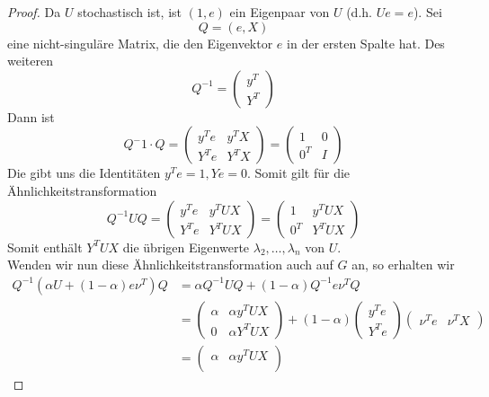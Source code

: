 \documentclass[]{article}
\begin{document}
\begin{proof}
	Da $U$ stochastisch ist, ist $(1, e)$ ein Eigenpaar von $U$ (d.h. $Ue = e$).
	Sei 
	\[ Q = (e, X) \]
	eine nicht-singuläre Matrix, die den Eigenvektor $e$ in der ersten Spalte hat. Des weiteren
	\[ Q^{-1} = \begin{pmatrix} y^T \\ Y^T \end{pmatrix} \]
	Dann ist
	\begin{equation*}
	Q^-1 \cdot Q =
	\begin{pmatrix}
	y^T e & y^T X \\
	Y^T e & Y^T X
	\end{pmatrix} =
	\begin{pmatrix}
	1 & 0 \\
	0^T & I 
	\end{pmatrix}
	\end{equation*}
	Die gibt uns die Identitäten $y^T e = 1, Ye = 0$. Somit gilt für die Ähnlichkeitstransformation 
	\begin{equation*}
	Q^{-1} U Q =
	\begin{pmatrix}
	y^T e & y^T U X \\
	Y^T e & Y^T U X
	\end{pmatrix} =
	\begin{pmatrix}
	1 & y^T U X \\
	0^T & Y^T U X 
	\end{pmatrix}
	\end{equation*}
	Somit enthält $Y^T U X$ die übrigen Eigenwerte $\lambda_2, \dotsc, \lambda_n$ von $U$. \\
	Wenden wir nun diese Ähnlichkeitstransformation auch auf $G$ an, so erhalten wir
	\begin{align*}
	Q^{-1} \left( \alpha U + (1- \alpha) e \nu^T \right) Q  
	&= \alpha Q^{-1} U Q + (1- \alpha) Q^{-1} e \nu^T Q \\
	&=
	\begin{pmatrix}
	\alpha & \alpha y^T U X \\
	0 & \alpha Y^T U X
	\end{pmatrix}
	+ (1-\alpha) \begin{pmatrix} y^T e \\ Y^T e \end{pmatrix} \begin{pmatrix} \nu^T e & \nu ^T X \end{pmatrix} \\
	&=
	\begin{pmatrix}
	\alpha & \alpha y^T U X \\

\end{pmatrix}
\end{align*}
\end{proof}
\end{document}
